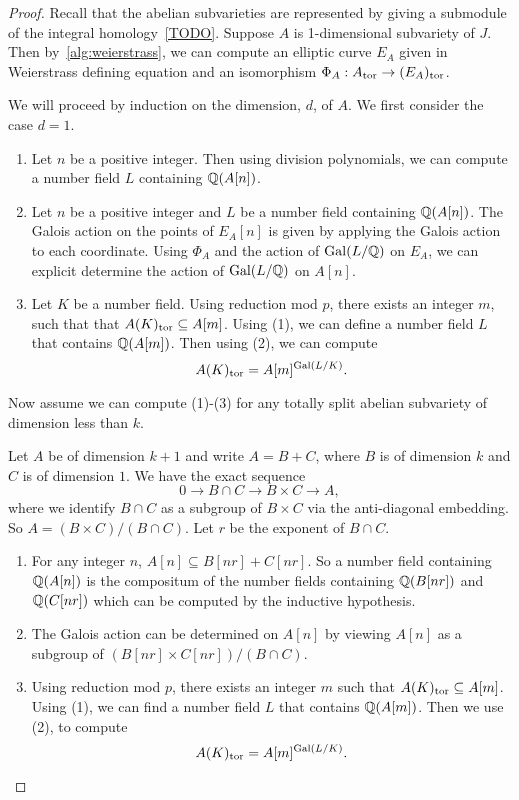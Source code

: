 \documentclass[11pt, proquest]{uwthesis}
\begin{document}
\begin{proof}
    Recall that the abelian subvarieties are represented by giving a submodule
    of the integral homology~\ref{TODO}. Suppose $A$ is 1-dimensional subvariety of
    $J$. Then by~\ref{alg:weierstrass}, we can compute an elliptic
    curve $E_A$ given in Weierstrass defining equation and an isomorphism
    $\Phi_A:A_{\mathrm{tor}}\to (E_A)_{\mathrm{tor}}$.

    We will proceed by induction on the dimension, $d$, of $A$. We first
    consider the case $d=1$.
    \begin{enumerate}
        \item
            Let $n$ be a positive integer. Then using division polynomials, we
            can compute a number field $L$ containing $\mathbb{Q}(A[n])$.
        \item
            Let $n$ be a positive integer and $L$ be a number field containing
            $\mathbb{Q}(A[n])$. The Galois action on the points of $E_A[n]$ is given
            by applying the Galois action to each coordinate. Using $\Phi_A$
            and the action of $\operatorname{Gal}(L/\mathbb{Q})$ on $E_A$, we can explicit determine
            the action of $\operatorname{Gal}(L/\mathbb{Q})$ on $A[n]$.
        \item
            Let $K$ be a number field. Using reduction mod $p$, there exists an
            integer $m$, such that that $A(K)_{\mathrm{tor}} \subseteq A[m]$. Using (1),
            we can define a number field $L$ that contains $\mathbb{Q}(A[m])$. Then
            using (2), we can compute
            \[
                A(K)_{\mathrm{tor}} = A[m]^{\operatorname{Gal}(L/K)}.
            \]
    \end{enumerate}

    Now assume we can compute (1)-(3) for any totally split abelian subvariety
    of dimension less than $k$.

    Let $A$ be of dimension $k+1$ and write $A=B+C$, where $B$ is of
    dimension $k$ and $C$ is of dimension $1$.  We have the exact sequence
    \[
        0\to B\cap C \to B\times C \to A,
    \]
    where we identify $B\cap C$ as a subgroup of $B\times C$ via the
    anti-diagonal embedding. So $A=(B\times C)/(B\cap C)$. Let $r$ be the
    exponent of $B\cap C$.
    \begin{enumerate}
        \item
            For any integer $n$, $A[n] \subseteq B[nr]+C[nr]$. So a number
            field containing $\mathbb{Q}(A[n])$ is the compositum  of the number
            fields containing $\mathbb{Q}(B[nr])$ and $\mathbb{Q}(C[nr])$ which can be
            computed by the inductive hypothesis.
        \item
            The Galois action can be determined on $A[n]$ by viewing $A[n]$ as
            a subgroup of $(B[nr]\times C[nr])/(B\cap C)$.
        \item
            Using reduction mod $p$, there exists an integer $m$ such that
            $A(K)_{\mathrm{tor}}\subseteq A[m]$. Using (1), we can find a number field
            $L$ that contains $\mathbb{Q}(A[m])$. Then we use (2), to compute
            \[
                A(K)_{\mathrm{tor}} = A[m]^{\operatorname{Gal}(L/K)}.
            \]
    \end{enumerate}
\end{proof}
\end{document}

